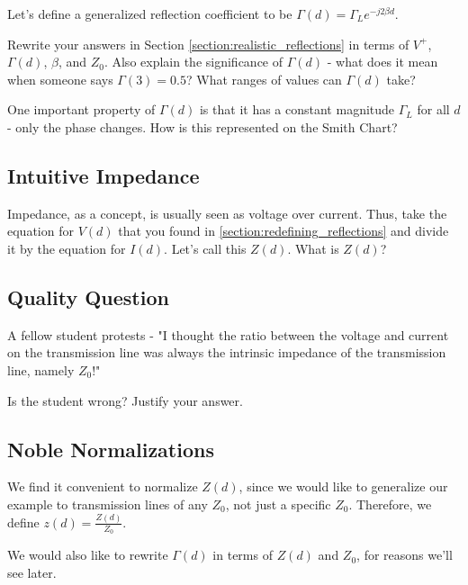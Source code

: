 \documentclass{article}
\begin{document}
Let's define a generalized reflection coefficient to be $\Gamma(d) = \Gamma_L e^{-j2 \beta d}$.

Rewrite your answers in Section \ref{section:realistic_reflections} in terms of $V^+$, $\Gamma(d)$, $\beta$, and $Z_0$. Also explain the significance of $\Gamma(d)$ - what does it mean when someone says $\Gamma(3) = 0.5$? What ranges of values can $\Gamma(d)$ take?

One important property of $\Gamma(d)$ is that it has a constant magnitude $\Gamma_L$ for all $d$ - only the phase changes. How is this represented on the Smith Chart?

\vspace{3cm}

\subsection{Intuitive Impedance}

Impedance, as a concept, is usually seen as voltage over current. Thus, take the equation for $V(d)$ that you found in \ref{section:redefining_reflections} and divide it by the equation for $I(d)$. Let's call this $Z(d)$. What is $Z(d)$?

\vspace{1cm}

\subsection{Quality Question}

A fellow student protests - "I thought the ratio between the voltage and current on the transmission line was always the intrinsic impedance of the transmission line, namely $Z_0$!"

Is the student wrong? Justify your answer.

\vspace{5cm}

\subsection{Noble Normalizations}

We find it convenient to normalize $Z(d)$, since we would like to generalize our example to transmission lines of any $Z_0$, not just a specific $Z_0$. Therefore, we define $z(d) = \frac{Z(d)}{Z_0}$.

We would also like to rewrite $\Gamma(d)$ in terms of $Z(d)$ and $Z_0$, for reasons we'll see later.
\end{document}
